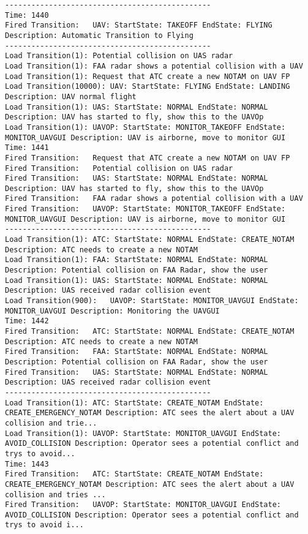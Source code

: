 \begin{spacing}{1}
\begin{verbatim}
-----------------------------------------------
Time: 1440
Fired Transition:	UAV: StartState: TAKEOFF EndState: FLYING Description: Automatic Transition to Flying
-----------------------------------------------
Load Transition(1):	Potential collision on UAS radar
Load Transition(1):	FAA radar shows a potential collision with a UAV
Load Transition(1):	Request that ATC create a new NOTAM on UAV FP
Load Transition(10000):	UAV: StartState: FLYING EndState: LANDING Description: UAV normal flight
Load Transition(1):	UAS: StartState: NORMAL EndState: NORMAL Description: UAV has started to fly, show this to the UAVOp
Load Transition(1):	UAVOP: StartState: MONITOR_TAKEOFF EndState: MONITOR_UAVGUI Description: UAV is airborne, move to monitor GUI
Time: 1441
Fired Transition:	Request that ATC create a new NOTAM on UAV FP
Fired Transition:	Potential collision on UAS radar
Fired Transition:	UAS: StartState: NORMAL EndState: NORMAL Description: UAV has started to fly, show this to the UAVOp
Fired Transition:	FAA radar shows a potential collision with a UAV
Fired Transition:	UAVOP: StartState: MONITOR_TAKEOFF EndState: MONITOR_UAVGUI Description: UAV is airborne, move to monitor GUI
-----------------------------------------------
Load Transition(1):	ATC: StartState: NORMAL EndState: CREATE_NOTAM Description: ATC needs to create a new NOTAM
Load Transition(1):	FAA: StartState: NORMAL EndState: NORMAL Description: Potential collision on FAA Radar, show the user
Load Transition(1):	UAS: StartState: NORMAL EndState: NORMAL Description: UAS received radar collision event
Load Transition(900):	UAVOP: StartState: MONITOR_UAVGUI EndState: MONITOR_UAVGUI Description: Monitoring the UAVGUI
Time: 1442
Fired Transition:	ATC: StartState: NORMAL EndState: CREATE_NOTAM Description: ATC needs to create a new NOTAM
Fired Transition:	FAA: StartState: NORMAL EndState: NORMAL Description: Potential collision on FAA Radar, show the user
Fired Transition:	UAS: StartState: NORMAL EndState: NORMAL Description: UAS received radar collision event
-----------------------------------------------
Load Transition(1):	ATC: StartState: CREATE_NOTAM EndState: CREATE_EMERGENCY_NOTAM Description: ATC sees the alert about a UAV collision and trie...
Load Transition(1):	UAVOP: StartState: MONITOR_UAVGUI EndState: AVOID_COLLISION Description: Operator sees a potential conflict and trys to avoid...
Time: 1443
Fired Transition:	ATC: StartState: CREATE_NOTAM EndState: CREATE_EMERGENCY_NOTAM Description: ATC sees the alert about a UAV collision and tries ...
Fired Transition:	UAVOP: StartState: MONITOR_UAVGUI EndState: AVOID_COLLISION Description: Operator sees a potential conflict and trys to avoid i...

\end{verbatim}
\end{spacing}

